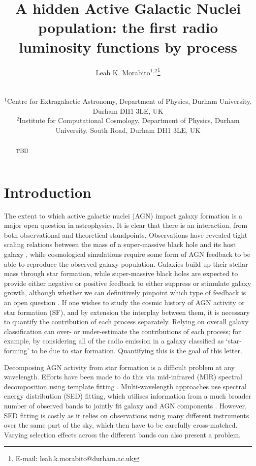 \documentclass[usenatbib,fleqn,letters]{mnras}
\title[TBD]{A hidden Active Galactic Nuclei population: the first radio luminosity functions by process}
\author[L.K. Morabito]{\parbox{\textwidth}{Leah K. Morabito$^{1,2}$\thanks{E-mail: leah.k.morabito@durham.ac.uk}\orcidlink{0000-0003-0487-6651}\\}\\ 
$^{1}$Centre for Extragalactic Astronomy, Department of Physics, Durham University, Durham DH1 3LE, UK \\
$^{2}$Institute for Computational Cosmology, Department of Physics, Durham University, South Road, Durham DH1 3LE, UK \\ }
\begin{document}
\date{}
\pagerange{\pageref{firstpage}--\pageref{lastpage}} 
\maketitle

\label{firstpage}


\begin{abstract}
    TBD
    \vspace{6.75in}
\end{abstract}




\section{Introduction}
\label{sec:intro}
The extent to which active galactic nuclei (AGN) impact galaxy formation is a major open question in astrophysics. It is clear that there is an interaction, from both observational and theoretical standpoints. Observations have revealed tight scaling relations between the mass of a super-massive black hole and its host galaxy \citep[see, e.g.][and references therein]{kormendy_coevolution_2013}, while cosmological simulations require some form of AGN feedback \citep{bower_breaking_2006,croton_many_2006} to be able to reproduce the observed galaxy population. Galaxies build up their stellar mass through star formation, while super-massive black holes are expected to provide either negative or positive feedback to either suppress or stimulate galaxy growth, although whether we can definitively pinpoint which type of feedback is an open question \citep{ward_cosmological_2022}. If one wishes to study the cosmic history of AGN activity or star formation (SF), and by extension the interplay between them, it is necessary to quantify the contribution of each process separately. Relying on overall galaxy classification can over- or under-estimate the contributions of each process; for example, by considering all of the radio emission in a galaxy classified as `star-forming' to be due to star formation. Quantifying this is the goal of this letter. 

Decomposing AGN activity from star formation is a difficult problem at any wavelength. Efforts have been made to do this via mid-infrared (MIR) spectral decomposition using template fitting \citep[e.g.,][]{laurent_mid-infrared_2000,hernan-caballero_resolving_2015,li_active_2024}. Multi-wavelength approaches use spectral energy distribution (SED) fitting, which utilises information from a much broader number of observed bands to jointly fit galaxy and AGN components \citep[e.g.][]{calistro_rivera_agnfitter_2016,boquien_cigale_2019,pacifici_art_2022}. However, SED fitting is costly as it relies on observations using many different instruments over the same part of the sky, which then have to be carefully cross-matched. Varying selection effects across the different bands can also present a problem. 
\end{document}
